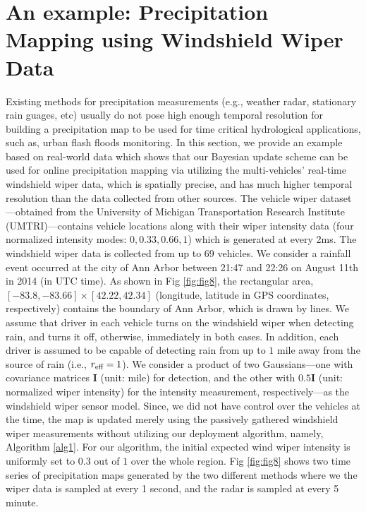 \documentclass[journal]{IEEEtran}
\begin{document}
\section{An example: Precipitation Mapping using Windshield Wiper Data}
\label{sec:sec8}
Existing methods for precipitation measurements (e.g., weather radar, stationary rain guages, etc) usually do not pose high enough temporal resolution for building a precipitation map to be used for time critical hydrological applications, such as, urban flash floods monitoring. In this section, we provide an example based on real-world data which shows that our Bayesian update scheme can be used for online precipitation mapping via utilizing the multi-vehicles' real-time windshield wiper data, which is spatially precise, and has much higher temporal resolution than the data collected from other sources.
The vehicle wiper dataset---obtained from the University
of Michigan Transportation Research Institute
(UMTRI)---contains vehicle locations along with their wiper
intensity data (four normalized intensity modes: $0,0.33,0.66,1$) which is generated at every 2ms. The windshield wiper data is collected from up to 69 vehicles. 
 We consider a rainfall event occurred at the city of Ann Arbor between 21:47 and 22:26 on August 11th in 2014 (in UTC time). As shown in Fig \ref{fig:fig8}, the rectangular area, $[-83.8,-83.66] \times [42.22,42.34]$ (longitude, latitude in GPS coordinates, respectively) contains the boundary of Ann Arbor, which is drawn by lines. We assume that driver in each vehicle turns on the windshield wiper when detecting rain, and turns it off, otherwise, immediately in both cases. In addition, each driver is assumed to be capable of detecting rain from up to $1$ mile away from the source of rain (i.e., $r_{\textup{eff}} = 1$). We consider a product of two Gaussians---one with covariance matrices $\mathbf{I}$ (unit: mile) for detection, and the other with $0.5\mathbf{I}$ (unit: normalized wiper intensity) for the intensity measurement, respectively---as the windshield wiper sensor model. Since, we did not have control over the vehicles at the time, the map is updated merely using the passively gathered windshield wiper measurements without utilizing our deployment algorithm, namely, Algorithm \ref{alg1}. For our algorithm, the initial expected wind wiper intensity is uniformly set to $0.3$ out of $1$ over the whole region. 
Fig \ref{fig:fig8} shows two time series of precipitation maps generated by the two different methods where we the wiper data is sampled at every 1 second, and the radar is sampled at every 5 minute.
\end{document}
